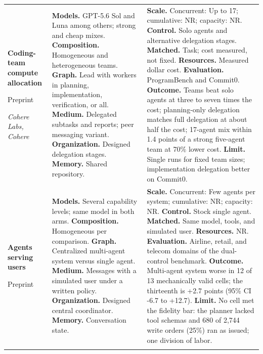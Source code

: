 \begin{longtable}{@{}>{\raggedright\arraybackslash}p{}>{\raggedright\arraybackslash}p{}>{\raggedright\arraybackslash}p{}@{}}
\textbf{Coding-team compute allocation}\par \citep{coding-team-compute-allocation}\par Preprint\par\emph{Cohere Labs, Cohere} & \textbf{Models.} GPT-5.6 Sol and Luna among others; strong and cheap mixes. \textbf{Composition.} Homogeneous and heterogeneous teams. \textbf{Graph.} Lead with workers in planning, implementation, verification, or all. \textbf{Medium.} Delegated subtasks and reports; peer messaging variant. \textbf{Organization.} Designed delegation stages. \textbf{Memory.} Shared repository. & \textbf{Scale.} Concurrent: Up to 17; cumulative: NR; capacity: NR. \textbf{Control.} Solo agents and alternative delegation stages. \textbf{Matched.} Task; cost measured, not fixed. \textbf{Resources.} Measured dollar cost. \textbf{Evaluation.} ProgramBench and Commit0. \textbf{Outcome.} Teams beat solo agents at three to seven times the cost; planning-only delegation matches full delegation at about half the cost; 17-agent mix within 1.4 points of a strong five-agent team at 70\% lower cost. \textbf{Limit.} Single runs for fixed team sizes; implementation delegation better on Commit0. \\ \addlinespace[5pt]
\textbf{Agents serving users}\par \citep{collaboration-serving-users}\par Preprint & \textbf{Models.} Several capability levels; same model in both arms. \textbf{Composition.} Homogeneous per comparison. \textbf{Graph.} Centralized multi-agent system versus single agent. \textbf{Medium.} Messages with a simulated user under a written policy. \textbf{Organization.} Designed central coordinator. \textbf{Memory.} Conversation state. & \textbf{Scale.} Concurrent: Few agents per system; cumulative: NR; capacity: NR. \textbf{Control.} Stock single agent. \textbf{Matched.} Same model, tools, and simulated user. \textbf{Resources.} NR. \textbf{Evaluation.} Airline, retail, and telecom domains of the dual-control benchmark. \textbf{Outcome.} Multi-agent system worse in 12 of 13 mechanically valid cells; the thirteenth is +2.7 points (95\% CI -6.7 to +12.7). \textbf{Limit.} No cell met the fidelity bar: the planner lacked tool schemas and 680 of 2,744 write orders (25\%) ran as issued; one division of labor. \\ \addlinespace[5pt]

\end{longtable}
